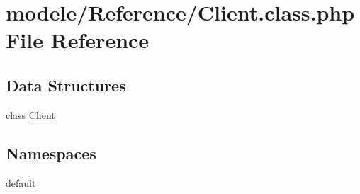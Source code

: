 \hypertarget{_client_8class_8php}{}\section{modele/\+Reference/\+Client.class.\+php File Reference}
\label{_client_8class_8php}
\subsection*{Data Structures}
\begin{DoxyCompactItemize}
\item 
class \hyperlink{class_client}{Client}
\end{DoxyCompactItemize}
\subsection*{Namespaces}
\begin{DoxyCompactItemize}
\item 
 \hyperlink{namespacedefault}{default}
\end{DoxyCompactItemize}
